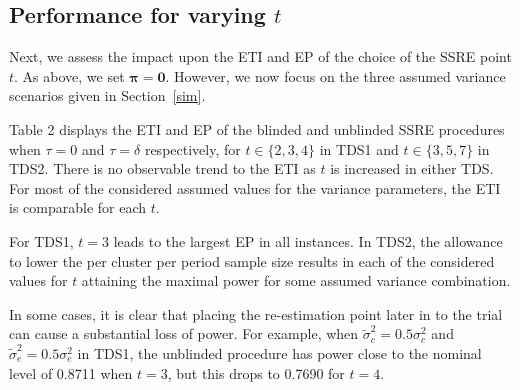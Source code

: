 \documentclass{article}
\begin{document}
\subsection{Performance for varying $t$}

Next, we assess the impact upon the ETI and EP of the choice of the SSRE point $t$. As above, we set $\boldsymbol{\pi}=\boldsymbol{0}$. However, we now focus on the three assumed variance scenarios given in Section~\ref{sim}.

Table 2 displays the ETI and EP of the blinded and unblinded SSRE procedures when $\tau=0$ and $\tau=\delta$ respectively, for $t\in\{2,3,4\}$ in TDS1 and $t\in\{3,5,7\}$ in TDS2. There is no observable trend to the ETI as $t$ is increased in either TDS. For most of the considered assumed values for the variance parameters, the ETI is comparable for each $t$.

For TDS1, $t=3$ leads to the largest EP in all instances. In TDS2, the allowance to lower the per cluster per period sample size results in each of the considered values for $t$ attaining the maximal power for some assumed variance combination.

In some cases, it is clear that placing the re-estimation point later in to the trial can cause a substantial loss of power. For example, when $\tilde{\sigma}_c^2=0.5\sigma_c^2$ and $\tilde{\sigma}_e^2=0.5\sigma_e^2$ in TDS1, the unblinded procedure has power close to the nominal level of 0.8711 when $t=3$, but this drops to 0.7690 for $t=4$.
\end{document}
